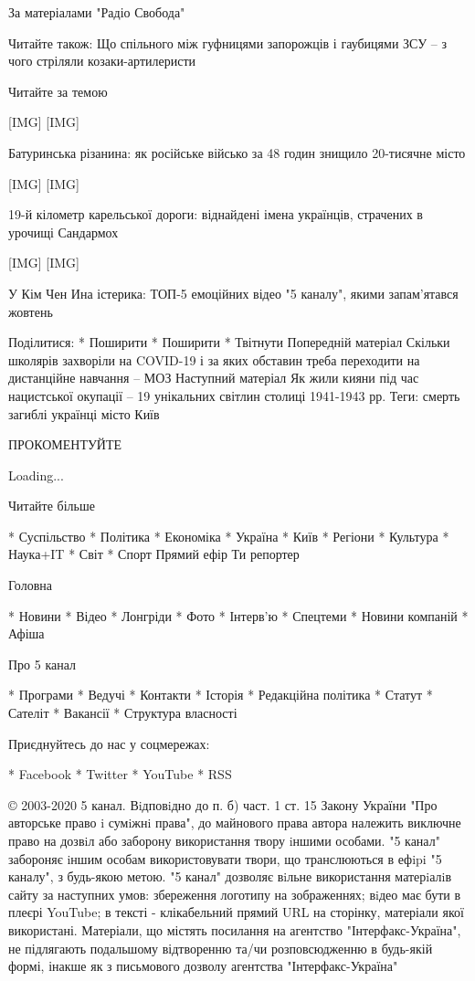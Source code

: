 За матеріалами "Радіо Свобода"

Читайте також: Що спільного між гуфницями запорожців і гаубицями ЗСУ – з
чого стріляли козаки-артилеристи

Читайте за темою

[IMG] [IMG]

Батуринська різанина: як російське військо за 48 годин знищило 20-тисячне
місто

[IMG] [IMG]

19-й кілометр карельської дороги: віднайдені імена українців, страчених в
урочищі Сандармох

[IMG] [IMG]

У Кім Чен Ина істерика: ТОП-5 емоційних відео "5 каналу", якими запам'ятався
жовтень

Поділитися:
* Поширити
* Поширити
* Твітнути
Попередній матеріал
Скільки школярів захворіли на COVID-19 і за яких обставин треба переходити
на дистанційне навчання – МОЗ
Наступний матеріал
Як жили кияни під час нацистської окупації – 19 унікальних світлин столиці
1941-1943 рр.
Теги:
смерть загиблі українці місто Київ

ПРОКОМЕНТУЙТЕ

Loading...

Читайте більше

* Суспільство
* Політика
* Економіка
* Україна
* Київ
* Регіони
* Культура
* Наука+IT
* Світ
* Спорт
Прямий ефір Ти репортер

Головна

* Новини
* Відео
* Лонгріди
* Фото
* Інтерв'ю
* Спецтеми
* Новини компаній
* Афіша

Про 5 канал

* Програми
* Ведучі
* Контакти
* Історія
* Редакційна політика
* Статут
* Сателіт
* Вакансії
* Структура власності

Приєднуйтесь до нас у соцмережах:

* Facebook
* Twitter
* YouTube
* RSS

© 2003-2020 5 канал. Вiдповiдно до п. б) част. 1 ст. 15 Закону України
"Про авторське право i сумiжнi права", до майнового права автора належить
виключне право на дозвiл або заборону використання твору iншими особами.
"5 канал" забороняє iншим особам використовувати твори, що транслюються в
ефipi "5 каналу", з будь-якою метою. "5 канал" дозволяє вiльне
використання матерiалiв сайту за наступних умов: збереження логотипу на
зображеннях; вiдео має бути в плеєрі YouTube; в тексті - клікабельний
прямий URL на сторінку, матеріали якої використані. Матеріали, що містять
посилання на агентство "Інтерфакс-Україна", не підлягають подальшому
відтворенню та/чи розповсюдженню в будь-якій формі, інакше як з письмового
дозволу агентства "Інтерфакс-Україна"
